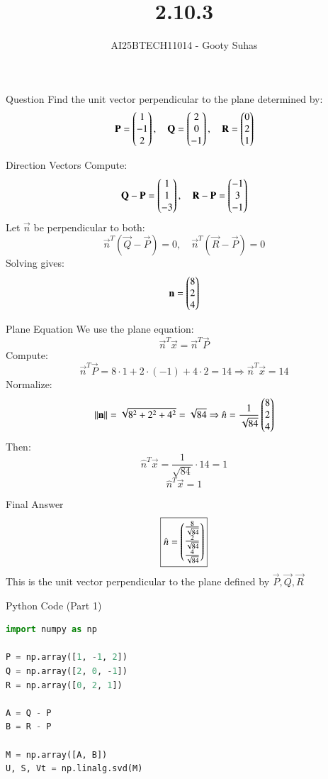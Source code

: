 \documentclass{beamer}
\title{2.10.3}
\author{AI25BTECH11014 - Gooty Suhas}
\begin{document}
\frame{\titlepage}

\begin{frame}{Question}
Find the unit vector perpendicular to the plane determined by:
\[
\mathbf{P} = \begin{pmatrix}1 \\ -1 \\ 2\end{pmatrix},\quad
\mathbf{Q} = \begin{pmatrix}2 \\ 0 \\ -1\end{pmatrix},\quad
\mathbf{R} = \begin{pmatrix}0 \\ 2 \\ 1\end{pmatrix}
\]
\end{frame}

\begin{frame}{Direction Vectors}
Compute:
\[
\mathbf{Q} - \mathbf{P} = \begin{pmatrix}1 \\ 1 \\ -3\end{pmatrix},\quad
\mathbf{R} - \mathbf{P} = \begin{pmatrix}-1 \\ 3 \\ -1\end{pmatrix}
\]
Let \( \vec{n} \) be perpendicular to both:
\[
\vec{n}^T (\vec{Q} - \vec{P}) = 0,\quad
\vec{n}^T (\vec{R} - \vec{P}) = 0
\]
Solving gives:
\[
\mathbf{n} = \begin{pmatrix}8 \\ 2 \\ 4\end{pmatrix}
\]
\end{frame}

\begin{frame}{Plane Equation}
We use the plane equation:
\[
\vec{n}^T \vec{x} = \vec{n}^T \vec{P}
\]
Compute:
\[
\vec{n}^T \vec{P} = 8 \cdot 1 + 2 \cdot (-1) + 4 \cdot 2 = 14
\Rightarrow \vec{n}^T \vec{x} = 14
\]
Normalize:
\[
\|\mathbf{n}\| = \sqrt{8^2 + 2^2 + 4^2} = \sqrt{84}
\Rightarrow \hat{n} = \frac{1}{\sqrt{84}} \begin{pmatrix}8 \\ 2 \\ 4\end{pmatrix}
\]
Then:
\[
\hat{n}^T \vec{x} = \frac{1}{\sqrt{84}} \cdot 14 = 1
\]
\[
\boxed{\hat{n}^T \vec{x} = 1}
\]
\end{frame}

\begin{frame}{Final Answer}
\[
\boxed{
\hat{n} = \begin{pmatrix}\frac{8}{\sqrt{84}} \\
\frac{2}{\sqrt{84}} \\
\frac{4}{\sqrt{84}}\end{pmatrix}
}
\]
This is the unit vector perpendicular to the plane
defined by \( \vec{P}, \vec{Q}, \vec{R} \)
\end{frame}
\begin{frame}[fragile]{Python Code (Part 1)}
\begin{lstlisting}[language=Python]
import numpy as np

P = np.array([1, -1, 2])
Q = np.array([2, 0, -1])
R = np.array([0, 2, 1])

A = Q - P
B = R - P

M = np.array([A, B])
U, S, Vt = np.linalg.svd(M)
\end{lstlisting}
\end{frame}
\end{document}
